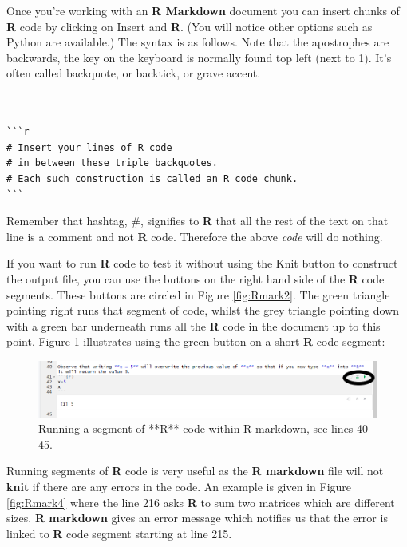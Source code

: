 \documentclass[
]{book}
\begin{document}
Once you're working with an \textbf{R Markdown} document you can insert chunks of \textbf{R} code by clicking on Insert and \textbf{R}. (You will notice other options such as Python are available.) The syntax is as follows. Note that the apostrophes are backwards, the key on the keyboard is normally found top left (next to 1). It's often called backquote, or backtick, or grave accent.

\begin{verbatim}


```r
# Insert your lines of R code
# in between these triple backquotes.
# Each such construction is called an R code chunk.
```
\end{verbatim}

Remember that hashtag, \#, signifies to \textbf{R} that all the rest of the text on that line is a comment and not \textbf{R} code. Therefore the above \emph{code} will do nothing.

If you want to run \textbf{R} code to test it without using the Knit button to construct the output file, you can use the buttons on the right hand side of the \textbf{R} code segments. These buttons are circled in Figure \ref{fig:Rmark2}. The green triangle pointing right runs that segment of code, whilst the grey triangle pointing down with a green bar underneath runs all the \textbf{R} code in the document up to this point. Figure \ref{fig:Rmark3} illustrates using the green button on a short \textbf{R} code segment:

\begin{figure}
\includegraphics[width=0.8\linewidth]{Images/Rmarkdown_2a} \caption{Running a segment of **R** code within R markdown, see lines 40-45.}\label{fig:Rmark3}
\end{figure}

Running segments of \textbf{R} code is very useful as the \textbf{R markdown} file will not \textbf{knit} if there are any errors in the code. An example is given in Figure \ref{fig:Rmark4} where the line 216 asks \textbf{R} to sum two matrices which are different sizes. \textbf{R markdown} gives an error message which notifies us that the error is linked to \textbf{R} code segment starting at line 215.
\end{document}
